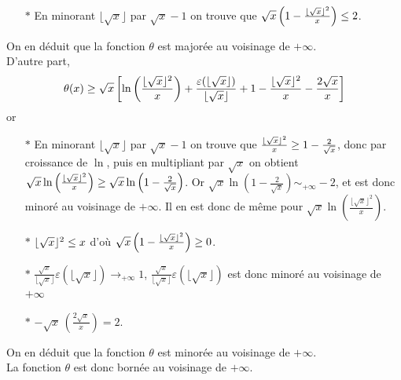 \begin{enumerate}
\begin{itemize}
\item[$\ast$] En minorant $\lfloor\sqrt{x}\rfloor$ par $\sqrt x-1$ on trouve que $\sqrt{x}\left( 1-\frac{\lfloor\sqrt{x}\rfloor^2}x\right) \leq 2$.   
\end{itemize}
On en déduit que la fonction $\theta$ est majorée au voisinage de $+\infty$.\\
D'autre part, 
\begin{displaymath}
\theta(x)\geq \sqrt{x}\left[ 
     \ln\left( \frac{\lfloor\sqrt{x}\rfloor^2}x \right)
    + \frac{ \varepsilon(\lfloor\sqrt{x}\rfloor)}{\lfloor\sqrt{x}\rfloor} 
    + 1-\frac{\lfloor\sqrt{x}\rfloor^2}x-\frac{2\sqrt x}x 
 \right]  
\end{displaymath}
or
\begin{itemize}
\item[$\ast$] En minorant $\lfloor\sqrt{x}\rfloor$ par $\sqrt x-1$ on trouve que $\frac{\lfloor\sqrt{x}\rfloor^2}{x}\geq 1-\frac{2}{\sqrt x}$, donc par croissance de $\ln$, puis en multipliant par $\sqrt x$ on obtient $\sqrt{x}\ln\left(\frac{\lfloor\sqrt{x}\rfloor^2}{x}\right)\geq \sqrt{x}\ln\left(1-\frac{2}{\sqrt x}\right)$. Or $\sqrt{x}\ln\left(1-\frac{2}{\sqrt x}\right)\sim_{+\infty}-2$, et est donc minoré au voisinage de $+\infty$. Il en est donc de même pour $\sqrt{x}\ln\left(\frac{\lfloor\sqrt{x}\rfloor^2}{x}\right)$.
\item[$\ast$] $\lfloor\sqrt{x}\rfloor^2\leq x$ d'où $\sqrt x\left(1-\frac{\lfloor\sqrt{x}\rfloor^2}x\right)\geq 0$. 
\item[$\ast$] $\frac {\sqrt x}{\lfloor\sqrt{x}\rfloor}\varepsilon(\lfloor\sqrt{x}\rfloor)\to_{+\infty} 1$, $\frac {\sqrt x}{\lfloor\sqrt{x}\rfloor}\varepsilon(\lfloor\sqrt{x}\rfloor)$ est donc minoré au voisinage de $+\infty$
\item[$\ast$] $-\sqrt x\, \left( \frac{2\sqrt x}x\right) = 2$.
\end{itemize}
On en déduit que la fonction $\theta$ est minorée au voisinage de $+\infty$.\\
La fonction $\theta$ est donc bornée au voisinage de $+\infty$.  
\end{enumerate}


